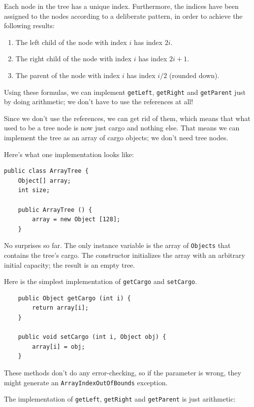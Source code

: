 \documentclass[12pt]{book}
\theoremstyle{exercise}
\begin{document}
Each node in the tree has a unique index.
Furthermore, the indices have been assigned to the nodes according
to a deliberate pattern, in order to achieve the following
results:

\begin{enumerate}

\item The left child of the node with index $i$ has index $2i$.

\item The right child of the node with index $i$ has index $2i + 1$.

\item The parent of the node with index $i$ has index $i/2$ (rounded down).

\end{enumerate}

Using these formulas, we can implement {\tt getLeft}, {\tt getRight}
and {\tt getParent} just by doing arithmetic; we don't have to
use the references at all!

Since we don't use the references, we can get rid of them,
which means that what used to be a tree node is now just cargo
and nothing else.  That means we can implement the tree as an
array of cargo objects; we don't need tree nodes.

Here's what one implementation looks like:

\begin{verbatim}
public class ArrayTree {
    Object[] array;
    int size;

    public ArrayTree () {
        array = new Object [128];
    }
\end{verbatim}
%
No surprises so far.  The only instance variable is
the array of {\tt Objects} that contains the tree's cargo.
The constructor initializes the array
with an arbitrary initial capacity; the result is an empty tree.

Here is the simplest implementation of {\tt getCargo}
and {\tt setCargo}.

\begin{verbatim}
    public Object getCargo (int i) {
        return array[i];
    }

    public void setCargo (int i, Object obj) {
        array[i] = obj;
    }
\end{verbatim}

These methods don't do any error-checking, so if the parameter is
wrong, they might generate an {\tt ArrayIndexOutOfBounds}
exception.

The implementation of {\tt getLeft}, {\tt getRight}
and {\tt getParent} is just arithmetic:
\end{document}
